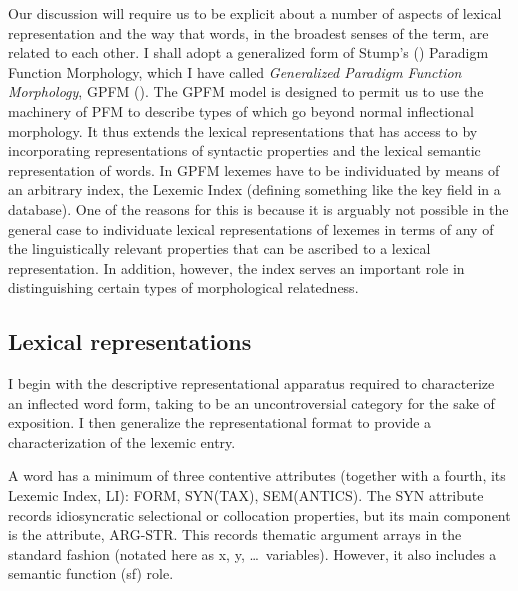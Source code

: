 \documentclass[output=paper,
modfonts
]{LSP/langsci}
\begin{document}
Our discussion will require us to be explicit about a number of aspects of lexical representation and the way that words, in the broadest senses of the term, are related to each other. 
I shall adopt a generalized form of Stump’s (\citeyear*{Stump01:book}) Paradigm Function Morphology, which I have called \emph{Generalized Paradigm Function Morphology}, GPFM (\citealt{Spencer13:book}). The GPFM model is designed to permit us to use the machinery of PFM to describe types of  which go beyond normal inflectional morphology. It thus extends the lexical representations that  has access to by incorporating representations of syntactic properties and the lexical semantic representation of words. In GPFM lexemes have to be individuated by means of an arbitrary index, the Lexemic Index (defining something like the key field in a database). One of the reasons for this is because it is arguably not possible in the general case to individuate lexical representations of lexemes in terms of any of the linguistically relevant properties that can be ascribed to a lexical representation. In addition, however, the index serves an important role in distinguishing certain types of morphological relatedness.%


\subsection{Lexical representations}	\label{sec:lexrep}

I begin with the descriptive representational  apparatus required to characterize an inflected word form, taking  to be an uncontroversial category for the sake of exposition. I then generalize the representational format to provide a characterization of the lexemic entry.

A word has a minimum of three contentive attributes (together with a fourth, its Lexemic Index, LI): FORM, SYN(TAX), SEM(ANTICS). %
The SYN attribute records idiosyncratic selectional or collocation properties, but its main component is the   attribute, ARG-STR. This records thematic argument arrays in the standard fashion (notated here as x, y, \ldots\ variables). However, it also includes a semantic function (sf) role. 
\end{document}

